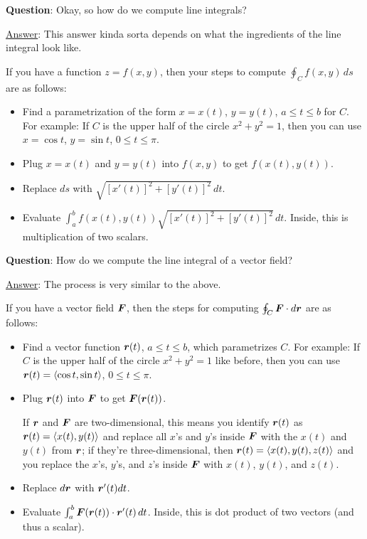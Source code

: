 \documentclass[12pt]{article}
\renewcommand{\Q}{\vspace{4.5mm}\noindent\textbf{Question}: }
\newcommand{\Ans}{\ul{Answer}: }
\begin{document}
	\Q Okay, so how do we compute line integrals?
	
	\Ans This answer kinda sorta depends on what the ingredients of the line integral look like.
	
	If you have a function $z=f(x,y)$, then your steps to compute $\oint_Cf(x,y)\,ds$ are as follows:
	\begin{itemize}[leftmargin=0.625in,rightmargin=0.5in,itemsep=0in]
		\item Find a parametrization of the form $x=x(t)$, $y=y(t)$, $a\leq t\leq b$ for $C$. For example: If $C$ is the upper half of the circle $x^2+y^2=1$, then you can use $x=\cos{t}$, $y=\sin{t}$, $0\leq t\leq \pi$.
		\item Plug $x=x(t)$ and $y=y(t)$ into $f(x,y)$ to get $f(x(t),y(t))$.
		\item Replace $ds$ with $\sqrt{[x'(t)]^2+[y'(t)]^2}\,dt$.
		\item Evaluate $\int_a^b f(x(t),y(t))\sqrt{[x'(t)]^2+[y'(t)]^2}\,dt$. Inside, this is multiplication of two scalars.
	\end{itemize}

	\Q How do we compute the line integral of a vector field?
	
	\Ans The process is very similar to the above.
	
	If you have a vector field $\boldsymbol{F}$, then the steps for computing $\oint_C\boldsymbol{F}\cdot d\boldsymbol{r}$ are as follows:
	\begin{itemize}[leftmargin=0.625in,rightmargin=0.5in,itemsep=0in]
		\setlength\parindent{0.25in}
		\item Find a vector function $\boldsymbol{r}(t)$, $a\leq t\leq b$, which parametrizes $C$. For example: If $C$ is the upper half of the circle $x^2+y^2=1$ like before, then you can use $\boldsymbol{r}(t)=\langle\cos{t},\sin{t}\rangle$, $0\leq t\leq \pi$.
		\item Plug $\boldsymbol{r}(t)$ into $\boldsymbol{F}$ to get $\boldsymbol{F}(\boldsymbol{r}(t))$. 
		
		If $\boldsymbol{r}$ and $\boldsymbol{F}$ are two-dimensional, this means you identify $\boldsymbol{r}(t)$ as $\boldsymbol{r}(t)=\langle x(t),y(t)\rangle$ and replace all $x$'s and $y$'s inside $\boldsymbol{F}$ with the $x(t)$ and $y(t)$ from $\boldsymbol{r}$; if they're three-dimensional, then $\boldsymbol{r}(t)=\langle x(t),y(t),z(t)\rangle$ and you replace the $x$'s, $y$'s, and $z$'s inside $\boldsymbol{F}$ with $x(t)$, $y(t)$, and $z(t)$.
		\item Replace $d\boldsymbol{r}$ with $\boldsymbol{r}'(t)dt$.
		\item Evaluate $\int_a^b \boldsymbol{F}(\boldsymbol{r}(t))\cdot\boldsymbol{r}'(t)\,dt$. Inside, this is dot product of two vectors (and thus a scalar).
	\end{itemize}
\end{document}
